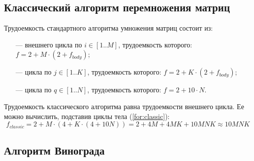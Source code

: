 \subsection{Классический алгоритм перемножения матриц}

Трудоемкость стандартного алгоритма умножения матриц состоит из:

\begin{itemize}
	\item[---] внешнего цикла по $i \in [1..M]$, трудоемкость которого: $f = 2 + M \cdot (2 + f_{body})$;
	\item[---] цикла по $j \in [1..K]$, трудоемкость которого: $f = 2 + K \cdot (2 + f_{body})$;
	\item[---] цикла по $q \in [1..N]$, трудоемкость которого: $f = 2 + 10 \cdot N$.
\end{itemize}

Трудоемкость классического алгоритма равна трудоемкости внешнего цикла.
Ее можно вычислить, подставив циклы тела (\ref{for:classic}):
\begin{equation}
	\label{for:classic}
	f_{classic} = 2 + M \cdot (4 + K \cdot (4 + 10N)) = 2 + 4M + 4MK + 10MNK \approx 10MNK
\end{equation}

\subsection{Алгоритм Винограда}

